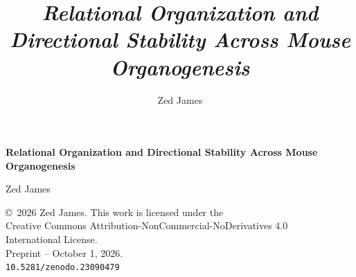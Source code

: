 \documentclass[11pt]{article}
\title{\textit{Relational Organization and Directional Stability Across Mouse Organogenesis}}
\author{Zed James}
\date{}
\begin{document}
\begin{titlepage}
  \centering
  \vspace*{0.17\textheight}
  {\LARGE\bfseries Relational Organization and Directional Stability Across Mouse Organogenesis\par}
  \vfill
  {\large Zed James\par}
  \vspace{1.5em}
  {\small \copyright\ 2026 Zed James. This work is licensed under the\\
  Creative Commons Attribution-NonCommercial-NoDerivatives 4.0\\
  International License.\\[0.8em]
  Preprint -- October 1, 2026.\\
  \texttt{10.5281/zenodo.23090479}\par}
  \vspace*{0.12\textheight}
\end{titlepage}
\end{document}
